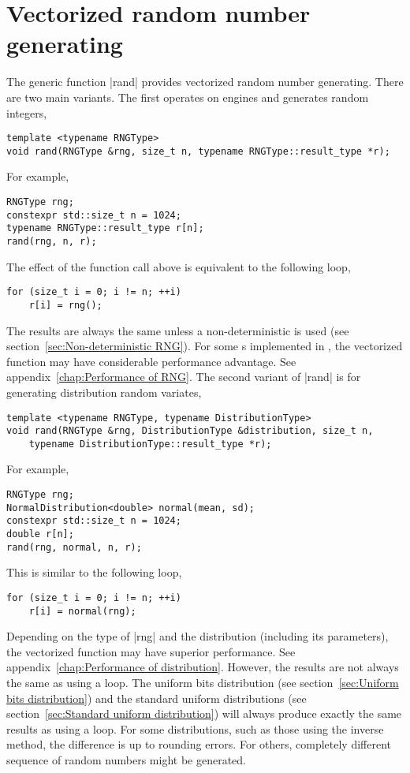 \section{Vectorized random number generating}
\label{sec:Vectorized random number generating}

The generic function |rand| provides vectorized random number generating. There
are two main variants. The first operates on \rng engines and generates random
integers,
\begin{verbatim}
template <typename RNGType>
void rand(RNGType &rng, size_t n, typename RNGType::result_type *r);
\end{verbatim}
For example,
\begin{verbatim}
RNGType rng;
constexpr std::size_t n = 1024;
typename RNGType::result_type r[n];
rand(rng, n, r);
\end{verbatim}
The effect of the function call above is equivalent to the following loop,
\begin{verbatim}
for (size_t i = 0; i != n; ++i)
    r[i] = rng();
\end{verbatim}
The results are always the same unless a non-deterministic \rng is used (see
section~\ref{sec:Non-deterministic RNG}). For some \rng{}s implemented in
\mckl, the vectorized function may have considerable performance advantage. See
appendix~\ref{chap:Performance of RNG}. The second variant of |rand| is for
generating distribution random variates,
\begin{verbatim}
template <typename RNGType, typename DistributionType>
void rand(RNGType &rng, DistributionType &distribution, size_t n,
    typename DistributionType::result_type *r);
\end{verbatim}
For example,
\begin{verbatim}
RNGType rng;
NormalDistribution<double> normal(mean, sd);
constexpr std::size_t n = 1024;
double r[n];
rand(rng, normal, n, r);
\end{verbatim}
This is similar to the following loop,
\begin{verbatim}
for (size_t i = 0; i != n; ++i)
    r[i] = normal(rng);
\end{verbatim}
Depending on the type of |rng| and the distribution (including its parameters),
the vectorized function may have superior performance. See
appendix~\ref{chap:Performance of distribution}. However, the results are not
always the same as using a loop. The uniform bits distribution (see
section~\ref{sec:Uniform bits distribution}) and the standard uniform
distributions (see section~\ref{sec:Standard uniform distribution}) will always
produce exactly the same results as using a loop. For some distributions, such
as those using the inverse method, the difference is up to rounding errors. For
others, completely different sequence of random numbers might be generated.

